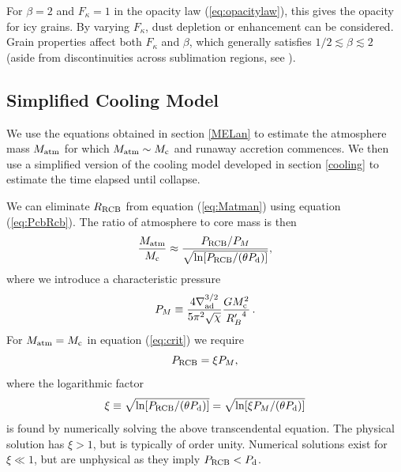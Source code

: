 \documentclass[apj]{emulateapj}
\newcommand{\delad}{\nabla_{\rm ad}}
\newcommand{\Eq}[1]{equation\,(\ref{#1})}
\newcommand{\co}{_{\rm c}}
\newcommand{\cb}{_{\rm RCB}}
\begin{document}
 For $\beta = 2$ and $F_\kappa = 1$ in the opacity law (\ref{eq:opacitylaw}), this gives the \citet{bell94} opacity for icy grains.  By varying $F_\kappa$, dust depletion or enhancement can be considered.  Grain properties affect both $F_\kappa$ and $\beta$, which generally satisfies  $1/2 \lesssim \beta \lesssim 2$ (aside from discontinuities across sublimation regions, see \citealt{semenov03}).







\subsection{Simplified Cooling Model}
\label{coolingan}

We use the equations obtained in section \ref{MELan} to estimate the atmosphere mass $M_{\rm{atm}}$ for which $M_{\rm{atm}} \sim M\co$ and runaway accretion commences. We then use a simplified version of the cooling model developed in section \ref{cooling} to estimate the time elapsed until collapse. 

We can eliminate $R\cb$ from equation (\ref{eq:Matman}) using \Eq{eq:PcbRcb}.  The ratio of atmosphere to core mass is then  
\begin{equation} \label{eq:crit}
{M_{\rm atm} \over M\co} \approx {P\cb /P_M \over  \sqrt{\ln[ P\cb/(\theta P_{\rm d})]}},
\end{equation} 
where we introduce a characteristic pressure
\begin{equation} 
P_M \equiv {4 \delad^{3/2} \over 5 \pi^2 \sqrt{\chi} } {G M\co^2 \over {R_B'}^4}\, .
\end{equation} 
For $M_{\rm atm} = M\co$ in equation (\ref{eq:crit}) we require
\begin{equation} \label{eq:Pcbc}
P\cb = \xi P_M ,
\end{equation} 
where  the logarithmic factor
\begin{equation}\label{eq:xi}
\xi \equiv \sqrt{\ln[ P\cb/(\theta P_{\rm d})]} = \sqrt{\ln[ \xi P_M / (\theta P_{\rm d})]}
\end{equation} 
is found by numerically solving the above transcendental equation. The physical solution has $\xi >1$, but is typically of order unity. Numerical solutions exist for $\xi \ll 1$, but are unphysical as they imply $P\cb < P_{\rm d}$.
\end{document}
